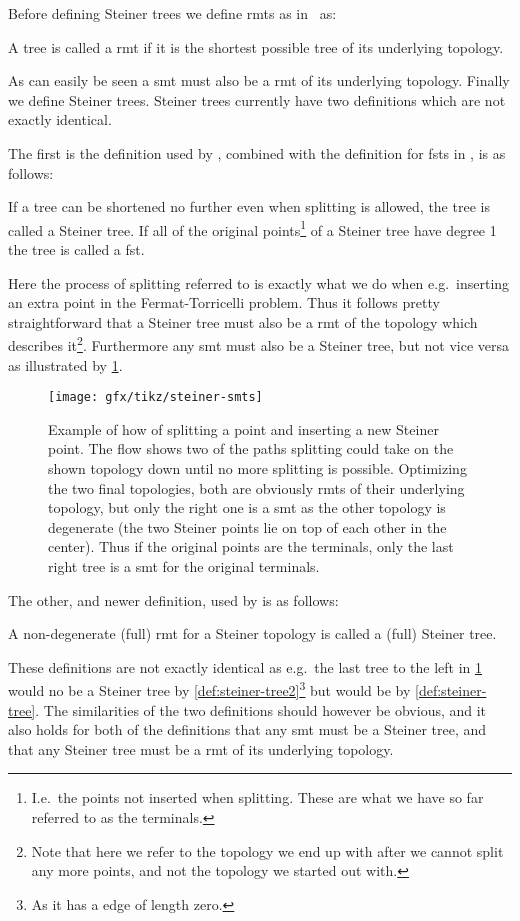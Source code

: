 Before defining Steiner trees we define \acp{rmt} as in~\cite{gilbert1968}
as:
%
\begin{definition}
  A tree is called a \acl{rmt} if it is the shortest possible tree of its
  underlying topology.
\end{definition}
%
As can easily be seen a \ac{smt} must also be a \ac{rmt} of its underlying
topology. Finally we define Steiner trees. Steiner trees currently have two definitions
which are not exactly identical.

The first is the definition used by \textcite{gilbert1968}, combined with the
definition for \acp{fst} in \textcite{smith1992}, is as follows:
%
\begin{definition}
  If a tree can be shortened no further even when splitting is allowed, the tree
  is called a Steiner tree. If all of the original points\footnote{I.e.\ the
    points not inserted when splitting. These are what we have so far referred
    to as the terminals.} of a Steiner tree have degree 1 the tree is called a \acl{fst}.\label{def:steiner-tree}
\end{definition}
%
Here the process of splitting referred to is exactly what we do when e.g.\
inserting an extra point in the Fermat-Torricelli problem. Thus it follows
pretty straightforward that a Steiner tree must also be a \ac{rmt} of the
topology which describes it\footnote{Note that here we refer to the topology we
  end up with after we cannot split any more points, and not the topology we
  started out with.}. Furthermore any \ac{smt} must also be a Steiner tree, but not
vice versa as illustrated by \cref{fig:steiner-smts}.
%
\begin{figure}[htbp]
\centering
\texttt{[image: gfx/tikz/steiner-smts]}
\caption[Example of splitting and \acp{rmt}]{Example of how of splitting a
  point and inserting a new Steiner point. The flow shows two of the paths
  splitting could take on the shown topology down until no more splitting is
  possible. Optimizing the two final topologies, both are obviously \acp{rmt}
  of their underlying topology, but only the right one is a \ac{smt} as the
  other topology is degenerate (the two Steiner points lie on top of each other
  in the center). Thus if the original points are the terminals, only the last
  right tree is a \ac{smt} for the original terminals.\label{fig:steiner-smts}}
\end{figure}
%
The other, and newer definition, used by \textcite{brazil2015} is as follows:
%
\begin{definition}
  A non-degenerate (full) \ac{rmt} for a Steiner topology is called a (full)
  Steiner tree.\label{def:steiner-tree2}
\end{definition}
%
These definitions are not exactly identical as e.g.\ the last tree to the left in
\cref{fig:steiner-smts} would no be a Steiner tree by
\cref{def:steiner-tree2}\footnote{As it has a edge of length zero.}
but would be by \cref{def:steiner-tree}. The similarities of the two definitions
should however be obvious, and it also holds for both of the definitions that
any \ac{smt} must be a Steiner tree, and that any Steiner tree must be a
\ac{rmt} of its underlying topology.

